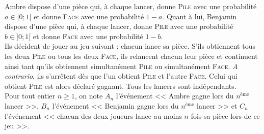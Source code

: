 \documentclass[landscape,twocolumn,leqno,a4paper,10pt]{report} %
\newcommand\n{\noindent}
\renewcommand{\geq}{\geqslant}
\begin{document}
\n Ambre dispose d'une pièce qui, à chaque lancer, donne \textsc{Pile} avec une probabilité $a \in] 0 ; 1[$ et donne \textsc{Face} avec une probabilité $1-a$. Quant à lui, Benjamin dispose d'une pièce qui, à chaque lancer, donne \textsc{Pile} avec une probabilité $b \in] 0 ; 1[$ et donne \textsc{Face} avec une probabilité $1-b$.\\
Ils décident de jouer au jeu suivant : chacun lance sa pièce. S'ils obtiennent tous les deux \textsc{Pile} ou tous les deux \textsc{Face}, ils relancent chacun leur pièce et continuent ainsi tant qu'ils obtiennent simultanément \textsc{Pile} ou simultanément \textsc{Face}. \textit{A contrario}, ils s'arrêtent dès que l'un obtient \textsc{Pile} et l'autre \textsc{Face}. Celui qui obtient \textsc{Pile} est alors déclaré gagnant. Tous les lancers sont indépendants.\\
Pour tout entier $n \geq 1$, on note $A_{n}$ l'événement << Ambre gagne lors du $n^{\text{ème}}$ lancer >>, $B_{n}$ l'événement << Benjamin gagne lors du $n^{\text{ème}}$ lancer >> et $C_{n}$ l'événement << chacun des deux joueurs lance au moins $n$ fois sa pièce lors de ce jeu >>.
\end{document}
